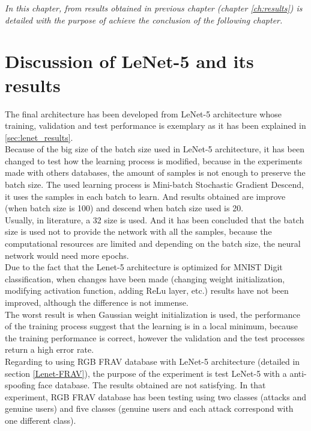\begin{small}
\emph{In this chapter, from results obtained in previous chapter (chapter \ref{ch:results}) is detailed with the purpose of achieve the conclusion of the following chapter.\\}
\end{small}

\section{Discussion of LeNet-5 and its results}
The final architecture has been developed from LeNet-5 architecture whose training, validation and test performance is exemplary as it has been explained in \ref{sec:lenet_results}.\\

Because of the big size of the batch size used in LeNet-5 architecture, it has been changed to test how the learning process is modified, because in the experiments made with others databases, the amount of samples is not enough to preserve the batch size. The used learning process is Mini-batch Stochastic Gradient Descend, it uses the samples in each batch to learn. And results obtained are improve (when batch size is 100) and descend when batch size used is 20. \\

Usually, in literature, a 32 size is used. And it has been concluded that the batch size is used not to provide the network with all the samples, because the computational resources are limited and depending on the batch size, the neural network would need more epochs.\\

Due to the fact that the Lenet-5 architecture is optimized for MNIST Digit classification, when changes have been made (changing weight initialization, modifying activation function, adding ReLu layer, etc.) results have not been improved, although the difference is not immense.\\

The worst result is when Gaussian weight initialization is used, the performance of the training process suggest that the learning is in a local minimum, because the training performance is correct, however the validation and the test processes return a high error rate.\\

Regarding to using RGB FRAV database with LeNet-5 architecture (detailed in section \ref{Lenet-FRAV}), the purpose of the experiment is test LeNet-5 with a anti-spoofing face database. The  results obtained are not satisfying. In that experiment, RGB FRAV database has been testing using two classes (attacks and genuine users) and five classes (genuine users and each attack correspond with one different class).\\

